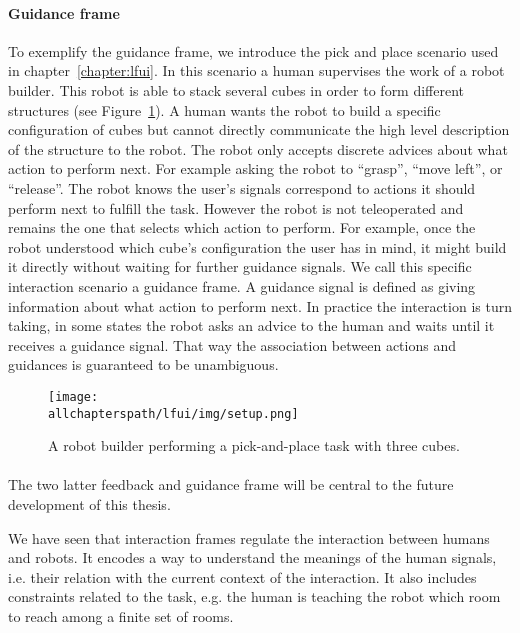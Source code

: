 \newpage

\paragraph{Guidance frame} 

To exemplify the guidance frame, we introduce the pick and place scenario used in chapter~\ref{chapter:lfui}. In this scenario a human supervises the work of a robot builder. This robot is able to stack several cubes in order to form different structures (see Figure~\ref{fig:guidancerobotexample}). A human wants the robot to build a specific configuration of cubes but cannot directly communicate the high level description of the structure to the robot. The robot only accepts discrete advices about what action to perform next. For example asking the robot to ``grasp'', ``move left'', or ``release''. The robot knows the user's signals correspond to actions it should perform next to fulfill the task. However the robot is not teleoperated and remains the one that selects which action to perform. For example, once the robot understood which cube's configuration the user has in mind, it might build it directly without waiting for further guidance signals. We call this specific interaction scenario a guidance frame. A guidance signal is defined as giving information about what action to perform next. In practice the interaction is turn taking, in some states the robot asks an advice to the human and waits until it receives a guidance signal. That way the association between actions and guidances is guaranteed to be unambiguous.

\begin{figure}[!htbp]
  \centering
  \texttt{[image: \\allchapterspath/lfui/img/setup.png]}
  \caption{A robot builder performing a pick-and-place task with three cubes.}
  \label{fig:guidancerobotexample}
\end{figure}

\paragraph{} The two latter feedback and guidance frame will be central to the future development of this thesis. 

\transition

We have seen that interaction frames regulate the interaction between humans and robots. It encodes a way to understand the meanings of the human signals, i.e. their relation with the current context of the interaction. It also includes constraints related to the task, e.g. the human is teaching the robot which room to reach among a finite set of rooms.

